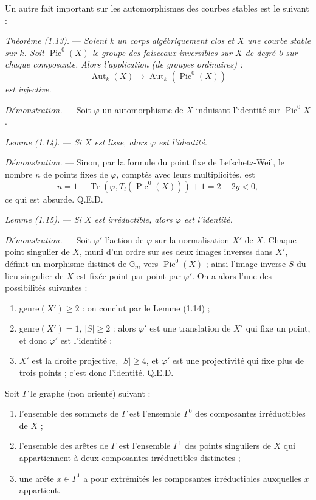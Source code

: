 \documentclass[10pt]{article}
\newcommand{\Aut}{\operatorname{Aut}}
\newcommand{\Pic}{\operatorname{Pic}}
\newcommand{\QED}{\hfill Q.E.D.}
\begin{document}
Un autre fait important sur les automorphismes des courbes stables est le suivant :

\medskip
\noindent\emph{Théorème (1.13).} --- \emph{Soient $k$ un corps algébriquement clos et $X$ une courbe stable sur $k$. Soit $\Pic^0(X)$ le groupe des faisceaux inversibles sur $X$ de degré 0 sur chaque composante. Alors l'application (de groupes ordinaires) :}
\[
\Aut_k(X)\longrightarrow \Aut_k(\Pic^0(X))
\]
\emph{est injective.}

\noindent\emph{Démonstration.} --- Soit $\varphi$ un automorphisme de $X$ induisant l'identité sur $\Pic^0X$.

\medskip
\noindent\emph{Lemme (1.14).} --- \emph{Si $X$ est lisse, alors $\varphi$ est l'identité.}

\noindent\emph{Démonstration.} --- Sinon, par la formule du point fixe de Lefschetz-Weil, le nombre $n$ de points fixes de $\varphi$, comptés avec leurs multiplicités, est
\[
n=1-\operatorname{Tr}(\varphi,T_l(\Pic^0(X)))+1=2-2g<0,
\]
ce qui est absurde. \QED

\medskip
\noindent\emph{Lemme (1.15).} --- \emph{Si $X$ est irréductible, alors $\varphi$ est l'identité.}

\noindent\emph{Démonstration.} --- Soit $\varphi'$ l'action de $\varphi$ sur la normalisation $X'$ de $X$. Chaque point singulier de $X$, muni d'un ordre sur ses deux images inverses dans $X'$, définit un morphisme distinct de $\mathbb G_m$ vers $\Pic^0(X)$ ; ainsi l'image inverse $S$ du lieu singulier de $X$ est fixée point par point par $\varphi'$. On a alors l'une des possibilités suivantes :
\begin{enumerate}[label=\emph{\alph*)}]
\item genre$(X')\geq2$ : on conclut par le Lemme (1.14) ;
\item genre$(X')=1$, $|S|\geq2$ : alors $\varphi'$ est une translation de $X'$ qui fixe un point, et donc $\varphi'$ est l'identité ;
\item $X'$ est la droite projective, $|S|\geq4$, et $\varphi'$ est une projectivité qui fixe plus de trois points ; c'est donc l'identité. \QED
\end{enumerate}


Soit $\Gamma$ le graphe (non orienté) suivant :
\begin{enumerate}[label=(\roman*)]
\item l'ensemble des sommets de $\Gamma$ est l'ensemble $\Gamma^0$ des composantes irréductibles de $X$ ;
\item l'ensemble des arêtes de $\Gamma$ est l'ensemble $\Gamma^1$ des points singuliers de $X$ qui appartiennent à deux composantes irréductibles distinctes ;
\item une arête $x\in\Gamma^1$ a pour extrémités les composantes irréductibles auxquelles $x$ appartient.
\end{enumerate}
\end{document}
